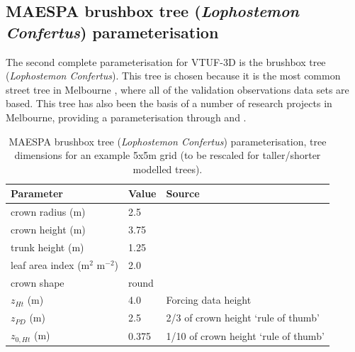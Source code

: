 \documentclass[final,3p,times,authoryear]{elsarticle}
\begin{document}
\subsection{MAESPA brushbox tree (\textit{Lophostemon Confertus}) parameterisation}
The second complete parameterisation for VTUF-3D is the  brushbox tree (\textit{Lophostemon Confertus}). This tree is chosen because it is the most common street tree in Melbourne \citep{Frank2006}, where all of the validation observations data sets are based. This tree has also been the basis of a number of research projects in Melbourne, providing a parameterisation through \cite{Coutts2016} and \cite{Coutts2015ICUC}.
%
%
%
\begin{center}
\begin{table}[!htbp]
\caption{MAESPA brushbox tree (\textit{Lophostemon Confertus}) parameterisation, tree dimensions for an example 5x5m grid (to be rescaled for taller/shorter modelled trees).\label{tab:brushscaled}} 
\begin{tabular}{ |  l | l | l |}
\hline \textbf{Parameter} & \textbf{Value}& \textbf{Source}   \\ 
\hline
 crown radius (m) & 2.5 &\cite{Coutts2016}\\ \hline
   crown height (m) & 3.75&\cite{Coutts2016} \\ \hline
 trunk height (m) & 1.25&\cite{Coutts2016} \\ \hline
  leaf area index (m$^{2}$ m$^{-2}$)&2.0&\cite{Wright2000} \\ \hline
 crown shape & round &\\ \hline
$z_{Ht}$ (m)&4.0&Forcing data height \\ \hline
$z_{PD}$ (m) &2.5 & 2/3 of crown height `rule of thumb' \citep{Grimmond1999}\\ \hline
$z_{0,Ht}$ (m) &0.375 & 1/10 of crown height `rule of thumb' \citep{Grimmond1999}\\ \hline
\end{tabular} 
\end{table}
\end{center}
\end{document}
